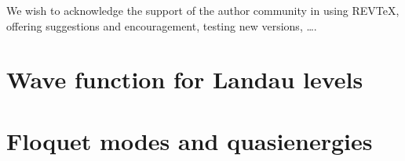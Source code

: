 \documentclass[%
 reprint,
 amsmath,amssymb,
 aps,
prb,
]{revtex4-2}
\begin{document}
\begin{acknowledgments}
We wish to acknowledge the support of the author community in using
REV\TeX{}, offering suggestions and encouragement, testing new versions,
\dots.
\end{acknowledgments}

\appendix

\section{Wave function for Landau levels}



\section{Floquet modes and quasienergies}




\nocite{*}

\end{document}
